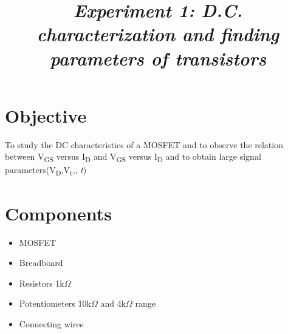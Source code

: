 \documentclass[12pt]{article}
\title{{\it \textbf{Experiment 1:\hspace{0.5cm} D.C. characterization and finding parameters of transistors}\/} }
\renewcommand{\baselinestretch}{0.5}
\begin{document}
 


\baselineskip14pt


\maketitle 








\renewcommand{\baselinestretch}{0.5} 

\section*{Objective}

To study the DC characteristics of a MOSFET and to observe the relation between V\textsubscript{GS} versus I\textsubscript{D} and V\textsubscript{GS} versus I\textsubscript{D} and to obtain large signal parameters(V\textsubscript{D},V\textsubscript{t},\lambda,
\textit{t})

\section*{Components}
\begin{itemize}
    \item MOSFET
    \item Breadboard%
    \item Resistors 1k$\Omega$
    \item Potentiometers 10k$\Omega$ and  4k$\Omega$  range
    \item Connecting wires
\end{itemize}
\end{document}
